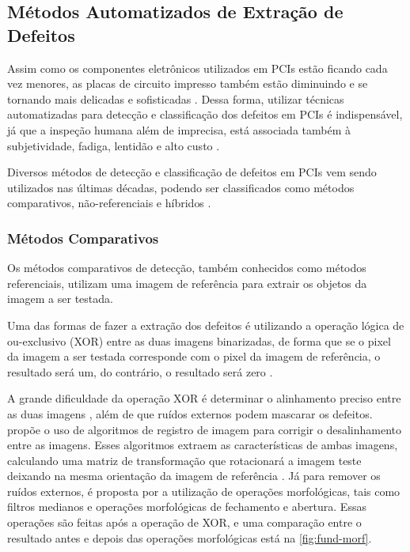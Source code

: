\begin{figure}[h!]
\begin{subfigure}[H]{0.3\textwidth}
        \label{fig:fund-defeitos6}
    \end{subfigure}
	\label{fig:fund-defeitos}
\end{figure}

\subsection{Métodos Automatizados de Extração de Defeitos} \label{cap:fund-pcb-metodos}

Assim como os componentes eletrônicos utilizados em PCIs estão ficando cada vez menores, as placas de circuito impresso também estão diminuindo e se tornando mais delicadas e sofisticadas \cite{ref:Hu-Wang}. Dessa forma, utilizar técnicas automatizadas para detecção e classificação dos defeitos em PCIs é indispensável, já que a inspeção humana além de imprecisa, está associada também à subjetividade, fadiga, lentidão e alto custo \cite{ref:Leta-Feliciano-Martins}.

Diversos métodos de detecção e classificação de defeitos em PCIs vem sendo utilizados nas últimas décadas, podendo ser classificados como métodos comparativos, não-referenciais e híbridos .

\subsubsection{Métodos Comparativos} \label{cap:fund-pcb-metodos-comp}
Os métodos comparativos de detecção, também conhecidos como métodos referenciais, utilizam uma imagem de referência para extrair os objetos da imagem a ser testada.

Uma das formas de fazer a extração dos defeitos é utilizando a operação lógica de ou-exclusivo (XOR) entre as duas imagens binarizadas, de forma que se o pixel da imagem a ser testada corresponde com o pixel da imagem de referência, o resultado será um, do contrário, o resultado será zero \cite{ref:Huang-et-al}.

A grande dificuldade da operação XOR é determinar o alinhamento preciso entre as duas imagens \cite{ref:Ding-et-al}, além de que ruídos externos podem mascarar os defeitos.  propõe o uso de algoritmos de registro de imagem para corrigir o desalinhamento entre as imagens. Esses algoritmos extraem as características de ambas imagens, calculando uma matriz de transformação que rotacionará a imagem teste deixando na mesma orientação da imagem de referência \cite{ref:Huang-et-al}. Já para remover os ruídos externos, é proposta por  a utilização de operações morfológicas, tais como filtros medianos e operações morfológicas de fechamento e abertura. Essas operações são feitas após a operação de XOR, e uma comparação entre o resultado antes e depois das operações morfológicas está na \autoref{fig:fund-morf}.

